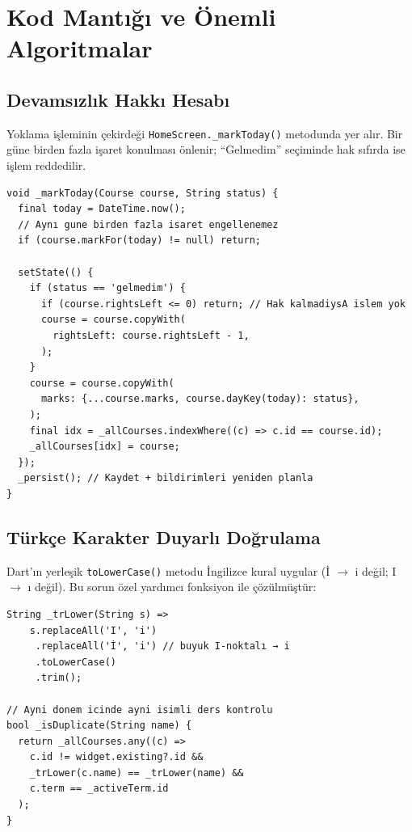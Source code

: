 \documentclass[12pt,a4paper]{article}
\begin{document}
\section{Kod Mantığı ve Önemli Algoritmalar}

\subsection{Devamsızlık Hakkı Hesabı}

Yoklama işleminin çekirdeği \texttt{HomeScreen.\_markToday()} metodunda yer alır. Bir güne birden fazla işaret konulması önlenir; ``Gelmedim'' seçiminde hak sıfırda ise işlem reddedilir.

\begin{lstlisting}[caption={Yoklama işaretleme ve hak azaltma mantığı (home\_screen.dart)}, label={lst:mark}]
void _markToday(Course course, String status) {
  final today = DateTime.now();
  // Aynı gune birden fazla isaret engellenemez
  if (course.markFor(today) != null) return;

  setState(() {
    if (status == 'gelmedim') {
      if (course.rightsLeft <= 0) return; // Hak kalmadiysA islem yok
      course = course.copyWith(
        rightsLeft: course.rightsLeft - 1,
      );
    }
    course = course.copyWith(
      marks: {...course.marks, course.dayKey(today): status},
    );
    final idx = _allCourses.indexWhere((c) => c.id == course.id);
    _allCourses[idx] = course;
  });
  _persist(); // Kaydet + bildirimleri yeniden planla
}
\end{lstlisting}

\subsection{Türkçe Karakter Duyarlı Doğrulama}

Dart'ın yerleşik \texttt{toLowerCase()} metodu İngilizce kural uygular (İ $\rightarrow$ i değil; I $\rightarrow$ ı değil). Bu sorun özel yardımcı fonksiyon ile çözülmüştür:

\begin{lstlisting}[caption={Türkçe karakter duyarlı küçük harf dönüşümü (add\_course\_screen.dart)}, label={lst:trlower}]
String _trLower(String s) =>
    s.replaceAll('I', 'i')
     .replaceAll('İ', 'i') // buyuk I-noktalı → i
     .toLowerCase()
     .trim();

// Ayni donem icinde ayni isimli ders kontrolu
bool _isDuplicate(String name) {
  return _allCourses.any((c) =>
    c.id != widget.existing?.id &&
    _trLower(c.name) == _trLower(name) &&
    c.term == _activeTerm.id
  );
}
\end{lstlisting}
\end{document}
